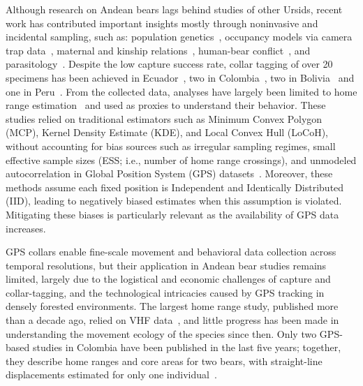\documentclass[lineno,referee,pdflatex,sn-vancouver-num]{sn-jnl}%
\theoremstyle{thmstyleone}%
\theoremstyle{thmstyletwo}%
\theoremstyle{thmstylethree}%
\begin{document}
Although research on Andean bears lags behind studies of other Ursids, recent work has contributed important insights mostly through noninvasive and incidental sampling, such as: population genetics~\cite{ruiz-garciaGeneticsAndeanBear2020,ruiz-garciaGeneticStructureSpectacled2020,ruiz-garciaMicrosatelliteAnalysisSpectacled2005,ruiz-garciaMolecularPopulationGenetic2003,cuevaEvidencePopulationGenetic2024}, occupancy models via camera trap data~\cite{castrillon-hoyosOccupancyHabitatUse2023,morrellRoadsForestCover2021}, maternal and kinship relations~\cite{castellanosMaternalBehaviorFemale2015,castellanosDoesRebeccaSeasoned2018,castellanosAreReportsCub2019,vasquezSocialBehaviorAndean2024}, human-bear conflict~\cite{castellanosSuggestionsMitigatingCattle2011}, and parasitology~\cite{castellanosRecordCanineDistemper2023,santodomingoNovelGenotypeBabesia2025}.
Despite the low capture success rate, collar tagging of over 20 specimens has been achieved in Ecuador~\cite{castellanosMamiferosGrandesMedianos2025,castellanosAndeanBearHome2011}, two in Colombia~\cite{rodriguezSpaceUseMale2021,vela-vargasNovelInsightsAndean2021}, two in Bolivia~\cite{paisleyActivityPatternsTime2005} and one in Peru~\cite{pillcohuarcayaEyesAndeanBear2024}. From the collected data, analyses have largely been limited to home range estimation~\cite{castellanosAndeanBearHome2011,rodriguezSpaceUseMale2021,vela-vargasNovelInsightsAndean2021,castellanosAndeanBearCore2013} and used as proxies to understand their behavior. These studies relied on traditional estimators such as Minimum Convex Polygon (MCP), Kernel Density Estimate (KDE), and Local Convex Hull (LoCoH), without accounting for bias sources such as irregular sampling regimes, small effective sample sizes (ESS; i.e., number of home range crossings), and unmodeled autocorrelation in Global Position System (GPS) datasets~\cite{silvaAutocorrelationinformedHomeRange2022,silvaTooFewToo2026,anandEstimatingPopulationRange2025}. Moreover, these methods assume each fixed position is Independent and Identically Distributed (IID), leading to negatively biased estimates when this assumption is violated. Mitigating these biases is particularly relevant as the availability of GPS data increases.

GPS collars enable fine-scale movement and behavioral data collection across temporal resolutions, but their application in Andean bear studies remains limited, largely due to the logistical and economic challenges of capture and collar-tagging, and the technological intricacies caused by GPS tracking in densely forested environments.
The largest home range study, published more than a decade ago, relied on VHF data~\cite{castellanosAndeanBearHome2011,castellanosAndeanBearCore2013}, and little progress has been made in understanding the movement ecology of the species since then. Only two GPS-based studies in Colombia have been published in the last five years; together, they describe home ranges and core areas for two bears, with straight-line displacements estimated for only one individual~\cite{rodriguezSpaceUseMale2021,vela-vargasNovelInsightsAndean2021}.
\end{document}
